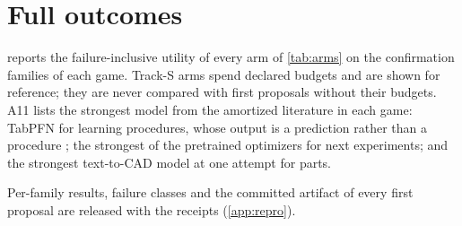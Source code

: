 \section{Full outcomes}
\label{app:outcomes}

 reports the failure-inclusive utility of every arm of \cref{tab:arms} on the
confirmation families of each game. Track-S arms spend declared budgets and are shown for reference;
they are never compared with first proposals without their budgets. A11 lists the strongest model
from the amortized literature in each game: TabPFN for learning procedures, whose output is a
prediction rather than a procedure \citep{hollmann2025tabpfn}; the strongest of the pretrained
optimizers for next experiments; and the strongest text-to-CAD model at one attempt for parts.

\begin{table}[h]
\caption{Failure-inclusive utility of every arm on confirmation families. Synthetic (gaps EZ-G01,
EZ-G03, EZ-G05, EZ-G08, EZ-G09); --- marks an arm not run in that game.}
\label{tab:outcomes}
\centering

\end{table}

Per-family results, failure classes and the committed artifact of every first proposal are released
with the receipts (\cref{app:repro}).
